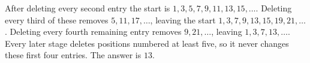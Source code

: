 After deleting every second entry the start is $1,3,5,7,9,11,13,15,\ldots$. Deleting every third of these removes $5,11,17,\ldots$, leaving the start $1,3,7,9,13,15,19,21,\ldots$. Deleting every fourth remaining entry removes $9,21,\ldots$, leaving $1,3,7,13,\ldots$. Every later stage deletes positions numbered at least five, so it never changes these first four entries. The answer is $\boxed{13}$.
